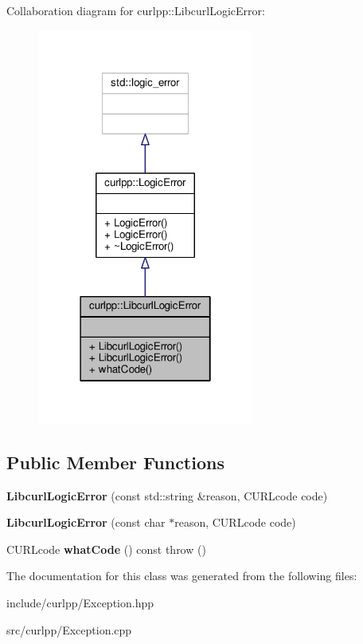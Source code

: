 Collaboration diagram for curlpp\-:\-:Libcurl\-Logic\-Error\-:\nopagebreak
\begin{figure}[H]
\begin{center}
\leavevmode
\includegraphics[width=202pt]{classcurlpp_1_1LibcurlLogicError__coll__graph}
\end{center}
\end{figure}
\subsection*{Public Member Functions}
\begin{DoxyCompactItemize}
\item 
\hypertarget{classcurlpp_1_1LibcurlLogicError_acffdd4ce862ac43eb96b102f5b9f0f45}{{\bfseries Libcurl\-Logic\-Error} (const std\-::string \&reason, C\-U\-R\-Lcode code)}\label{classcurlpp_1_1LibcurlLogicError_acffdd4ce862ac43eb96b102f5b9f0f45}

\item 
\hypertarget{classcurlpp_1_1LibcurlLogicError_a08fc15f967b15331581b4ec4f1fdf0d3}{{\bfseries Libcurl\-Logic\-Error} (const char $\ast$reason, C\-U\-R\-Lcode code)}\label{classcurlpp_1_1LibcurlLogicError_a08fc15f967b15331581b4ec4f1fdf0d3}

\item 
\hypertarget{classcurlpp_1_1LibcurlLogicError_aebac936bdd535f954712bcf6f00dd3d9}{C\-U\-R\-Lcode {\bfseries what\-Code} () const   throw ()}\label{classcurlpp_1_1LibcurlLogicError_aebac936bdd535f954712bcf6f00dd3d9}

\end{DoxyCompactItemize}


The documentation for this class was generated from the following files\-:\begin{DoxyCompactItemize}
\item 
include/curlpp/Exception.\-hpp\item 
src/curlpp/Exception.\-cpp\end{DoxyCompactItemize}

